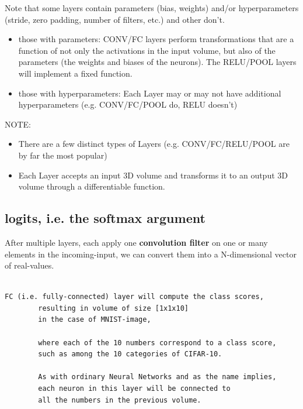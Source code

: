 Note that some layers contain parameters (bias, weights) and/or hyperparameters
(stride, zero padding, number of filters, etc.) and other don’t.
\begin{itemize}
  
  \item those with parameters: CONV/FC layers perform transformations that are a
  function of not only the activations in the input volume, but also of the
  parameters (the weights and biases of the neurons). The RELU/POOL layers will
  implement a fixed function.
  
 
  \item those with hyperparameters: Each Layer may or may not have additional
  hyperparameters (e.g. CONV/FC/POOL do, RELU doesn’t)
  
\end{itemize}

NOTE:
\begin{itemize}
  
  \item  There are a few distinct types of Layers (e.g. CONV/FC/RELU/POOL are by far the most popular)

  \item Each Layer accepts an input 3D volume and transforms it to an output 3D
  volume through a differentiable function.
  
\end{itemize}

\subsection{logits, i.e. the softmax argument}
\label{sec:logits}


After multiple layers, each apply one {\bf convolution filter} on one or many
elements in the incoming-input, we can convert them into a N-dimensional vector
of real-values. 
\begin{verbatim}

FC (i.e. fully-connected) layer will compute the class scores, 
        resulting in volume of size [1x1x10] 
        in the case of MNIST-image, 
        
        where each of the 10 numbers correspond to a class score, 
        such as among the 10 categories of CIFAR-10. 
        
        As with ordinary Neural Networks and as the name implies, 
        each neuron in this layer will be connected to 
        all the numbers in the previous volume.

\end{verbatim}

